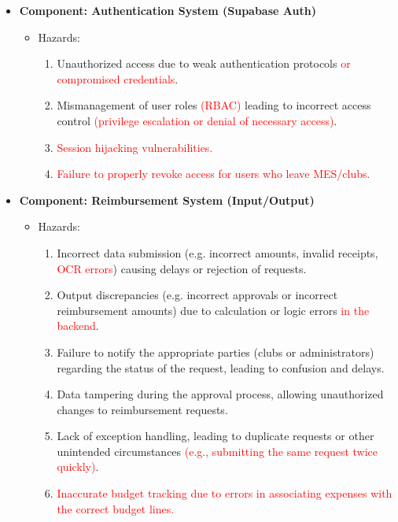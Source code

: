 \documentclass{article}
\begin{document}
\begin{itemize}
    \item \textbf{Component: Authentication System (Supabase Auth)} %
    \begin{itemize}
        \item Hazards:
        \begin{enumerate}
            \item Unauthorized access due to weak authentication protocols \textcolor{red}{or compromised credentials}.
            \item Mismanagement of user roles \textcolor{red}{(RBAC)} leading to incorrect access control \textcolor{red}{(privilege escalation or denial of necessary access)}.
            \item \textcolor{red}{Session hijacking vulnerabilities.}
            \item \textcolor{red}{Failure to properly revoke access for users who leave MES/clubs.}
        \end{enumerate}
    \end{itemize}

    \item \textbf{Component: Reimbursement System (Input/Output)}
    \begin{itemize}
        \item Hazards:
        \begin{enumerate}
            \item Incorrect data submission (e.g. incorrect amounts, invalid receipts, \textcolor{red}{OCR errors}) causing delays or rejection of requests.
            \item Output discrepancies (e.g. incorrect approvals or incorrect reimbursement amounts) due to calculation or logic errors \textcolor{red}{in the backend}.
            \item Failure to notify the appropriate parties (clubs or administrators) regarding the status of the request, leading to confusion and delays.
            \item Data tampering during the approval process, allowing unauthorized changes to reimbursement requests.
            \item Lack of exception handling, leading to duplicate requests or other unintended circumstances \textcolor{red}{(e.g., submitting the same request twice quickly)}.
            \item \textcolor{red}{Inaccurate budget tracking due to errors in associating expenses with the correct budget lines.}
        \end{enumerate}
    \end{itemize}

\end{itemize}
\end{document}
